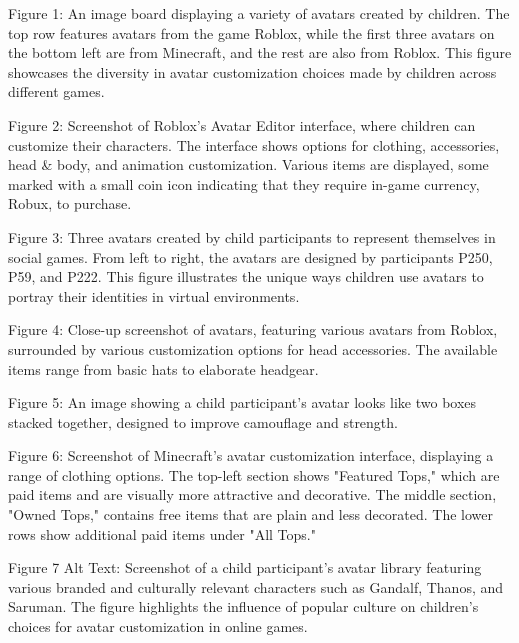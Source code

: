 Figure 1: An image board displaying a variety of avatars created by children. The top row features avatars from the game Roblox, while the first three avatars on the bottom left are from Minecraft, and the rest are also from Roblox. This figure showcases the diversity in avatar customization choices made by children across different games.

Figure 2: Screenshot of Roblox’s Avatar Editor interface, where children can customize their characters. The interface shows options for clothing, accessories, head & body, and animation customization. Various items are displayed, some marked with a small coin icon indicating that they require in-game currency, Robux, to purchase.

Figure 3: Three avatars created by child participants to represent themselves in social games. From left to right, the avatars are designed by participants P250, P59, and P222. This figure illustrates the unique ways children use avatars to portray their identities in virtual environments.

Figure 4: Close-up screenshot of avatars, featuring various avatars from Roblox, surrounded by various customization options for head accessories. The available items range from basic hats to elaborate headgear.

Figure 5: An image showing a child participant’s avatar looks like two boxes stacked together, designed to improve camouflage and strength. 

Figure 6: Screenshot of Minecraft's avatar customization interface, displaying a range of clothing options. The top-left section shows "Featured Tops," which are paid items and are visually more attractive and decorative. The middle section, "Owned Tops," contains free items that are plain and less decorated. The lower rows show additional paid items under "All Tops."

Figure 7 Alt Text: Screenshot of a child participant's avatar library featuring various branded and culturally relevant characters such as Gandalf, Thanos, and Saruman. The figure highlights the influence of popular culture on children's choices for avatar customization in online games.